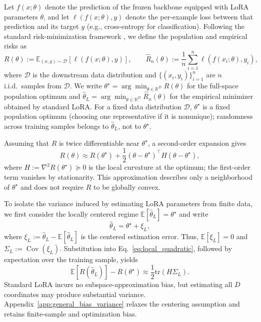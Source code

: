Let $f(x;\theta)$ denote the prediction of the frozen backbone equipped with LoRA parameters $\theta$, and let $\ell(f(x;\theta),y)$ denote the per-example loss between that prediction and its target $y$ (e.g., cross-entropy for classification).
Following the standard risk-minimization framework \citep{vapnik1998statistical,hastie2009elements,vanderVaart1998asymptotic}, we define the population and empirical risks as
\begin{equation}
R(\theta)
:=
\mathbb{E}_{(x,y)\sim\mathcal{D}}
\!\left[\ell(f(x;\theta),y)\right],
\qquad
\widehat R_n(\theta)
:=
\frac{1}{n}\sum_{i=1}^{n}
\ell(f(x_i;\theta),y_i),
\label{eq:population_empirical_risk}
\end{equation}
where $\mathcal{D}$ is the downstream data distribution and $\{(x_i,y_i)\}_{i=1}^n$ are $n$ i.i.d.\ samples from $\mathcal{D}$.
We write
$\theta^\star=\arg\min_{\theta\in\mathbb{R}^D}R(\theta)$
for the full-space population optimum and
$\hat{\theta}_L=\arg\min_{\theta\in\mathbb{R}^D}\widehat R_n(\theta)$
for the empirical minimizer obtained by standard LoRA.
For a fixed data distribution $\mathcal D$, $\theta^\star$ is a fixed population optimum (choosing one representative if it is nonunique); randomness across training samples belongs to $\hat\theta_L$, not to $\theta^\star$.

Assuming that $R$ is twice differentiable near $\theta^\star$, a second-order expansion gives
\begin{equation}
R(\theta)
\approx
R(\theta^\star)
+
\frac{1}{2}
(\theta-\theta^\star)^\top
H
(\theta-\theta^\star),
\label{eq:local_quadratic}
\end{equation}
where $H:=\nabla^2R(\theta^\star)\succeq 0$ is the local curvature at the optimum; the first-order term vanishes by stationarity.
This approximation describes only a neighborhood of $\theta^\star$ and does not require $R$ to be globally convex.

To isolate the variance induced by estimating LoRA parameters from finite data, we first consider the locally centered regime
$\mathbb{E}[\hat{\theta}_L]=\theta^\star$ and write
\begin{equation}
\hat{\theta}_L=\theta^\star+\xi_L,
\label{eq:lora_centered_decomp}
\end{equation}
where $\xi_L:=\hat{\theta}_L-\mathbb{E}[\hat{\theta}_L]$ is the centered estimation error.
Thus, $\mathbb{E}[\xi_L]=0$ and $\Sigma_L:=\operatorname{Cov}(\xi_L)$.
Substitution into Eq.~\eqref{eq:local_quadratic}, followed by expectation over the training sample, yields
\begin{equation}
\mathbb{E}[R(\hat{\theta}_L)]-R(\theta^\star)
\approx
\frac{1}{2}\mathrm{tr}(H\Sigma_L).
\label{eq:lora_excess_risk}
\end{equation}
Standard LoRA incurs no subspace-approximation bias, but estimating all $D$ coordinates may produce substantial variance.
Appendix~\ref{app:general_bias_variance} relaxes the centering assumption and retains finite-sample and optimization bias.

